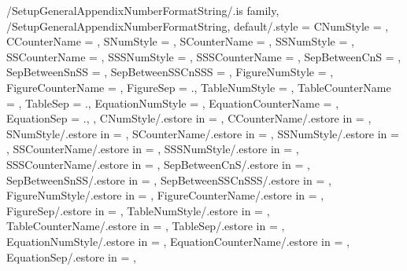 \pgfkeys
{
  /SetupGeneralAppendixNumberFormatString/.is family, /SetupGeneralAppendixNumberFormatString,
  default/.style =
  {
    CNumStyle = \empty,
    CCounterName = \empty,
    SNumStyle = \empty,
    SCounterName = \empty,
    SSNumStyle = \empty,
    SSCounterName = \empty,
    SSSNumStyle = \empty,
    SSSCounterName = \empty,
    SepBetweenCnS = \empty,
    SepBetweenSnSS = \empty,
    SepBetweenSSCnSSS = \empty,
    FigureNumStyle = \empty,
    FigureCounterName = \empty,
    FigureSep = {.},
    TableNumStyle = \empty,
    TableCounterName = \empty,
    TableSep = {.},
    EquationNumStyle = \empty,
    EquationCounterName = \empty,
    EquationSep = {.},
  },
  CNumStyle/.estore in = \TmpValueCNumStyle,
  CCounterName/.estore in = \TmpValueCCounterName,
  SNumStyle/.estore in = \TmpValueSNumStyle,
  SCounterName/.estore in = \TmpValueSCounterName,
  SSNumStyle/.estore in = \TmpValueSSNumStyle,
  SSCounterName/.estore in = \TmpValueSSCounterName,
  SSSNumStyle/.estore in = \TmpValueSSSNumStyle,
  SSSCounterName/.estore in = \TmpValueSSSCounterName,
  SepBetweenCnS/.estore in = \TmpValueSepBetweenCnS,
  SepBetweenSnSS/.estore in = \TmpValueSepBetweenSnSS,
  SepBetweenSSCnSSS/.estore in = \TmpValueSepBetweenSSCnSSS,
  FigureNumStyle/.estore in = \TmpValueFigureNumStyle,
  FigureCounterName/.estore in = \TmpValueFigureCounterName,
  FigureSep/.estore in = \TmpValueFigureSep,
  TableNumStyle/.estore in = \TmpValueTableNumStyle,
  TableCounterName/.estore in = \TmpValueTableCounterName,
  TableSep/.estore in = \TmpValueTableSep,
  EquationNumStyle/.estore in = \TmpValueEquationNumStyle,
  EquationCounterName/.estore in = \TmpValueEquationCounterName,
  EquationSep/.estore in = \TmpValueEquationSep,
} %

